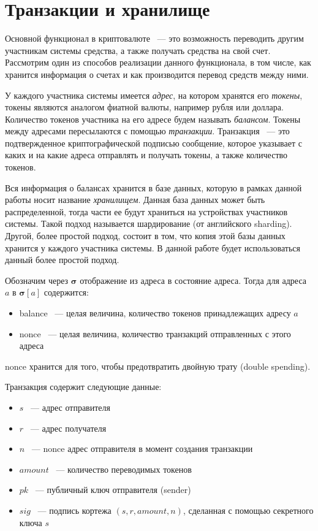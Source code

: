\section{Транзакции и хранилище} \label{sec:tx}
Основной функционал в криптовалюте ~--- это возможность переводить другим участникам системы средства, а также получать средства на свой счет.
Рассмотрим один из способов реализации данного функционала,
в том числе, как хранится информация о счетах и как производится перевод средств между ними.

У каждого участника системы имеется \textit{адрес}, на котором хранятся его \textit{токены}, токены
являются аналогом фиатной валюты, например рубля или доллара. Количество токенов участника на его адресе будем называть \textit{балансом}. Токены между адресами пересылаются с помощью \textit{транзакции}. Транзакция ~--- это подтвержденное криптографической подписью сообщение, которое указывает с каких и на какие адреса отправлять и получать токены, а также количество токенов.

Вся информация о балансах хранится в базе данных, которую в рамках данной работы носит название \textit{хранилищем}.
Данная база данных может быть распределенной, тогда части ее будут храниться на устройствах участников системы. 
Такой подход называется шардирование (от английского sharding). 
Другой, более простой подход, состоит в том, что копия этой базы данных хранится у каждого участника системы.
В данной работе будет использоваться данный более простой подход.

Обозначим через $\boldsymbol{\sigma}$ отображение из адреса в состояние адреса. Тогда для адреса $a$ в $\boldsymbol{\sigma}[a]$ содержится:
\begin{itemize}
\item balance ~--- целая величина, количество токенов принадлежащих адресу $a$
\item nonce  ~--- целая величина, количество транзакций отправленных с этого адреса
\end{itemize}

nonce хранится для того, чтобы предотвратить двойную трату (double spending)\cite{double-spending}.

\noindent Транзакция содержит следующие данные:
\begin{itemize}
\item $s$ ~--- адрес отправителя
\item $r$ ~--- адрес получателя
\item $n$ ~--- nonce адрес отправителя в момент создания транзакции
\item $amount$ ~--- количество переводимых токенов
\item $pk$ ~--- публичный ключ отправителя (sender)
\item $sig$ ~--- подпись кортежа $(s, r, amount, n)$, сделанная с помощью секретного ключа $s$
\end{itemize}

